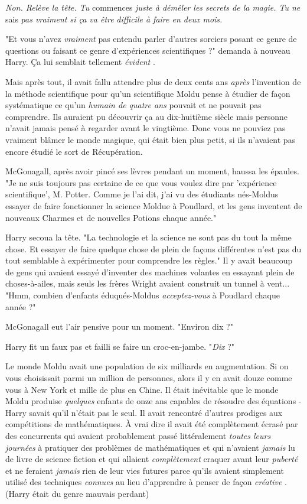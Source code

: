 \emph{Non. Relève la tête. Tu } commences \emph{juste à démêler les secrets de la magie. Tu ne } sais\emph{ pas vraiment si ça va être } \emph{difficile à faire en deux mois.} 

"Et vous n'avez \emph{vraiment}  pas entendu parler d'autres sorciers posant ce genre de questions ou faisant ce genre d'expériences scientifiques ?" demanda à nouveau Harry. Ça lui semblait tellement \emph{évident} .

Mais après tout, il avait fallu attendre plus de deux cents ans \emph{après}  l'invention de la méthode scientifique pour qu'un scientifique Moldu pense à étudier de façon systématique ce qu'un \emph{humain de quatre ans}  pouvait et ne pouvait pas comprendre. Ils auraient pu découvrir ça au dix-huitième siècle mais personne n'avait jamais pensé à regarder avant le vingtième. Donc vous ne pouviez pas vraiment blâmer le monde magique, qui était bien plus petit, si ils n'avaient pas encore étudié le sort de Récupération.

McGonagall, après avoir pincé ses lèvres pendant un moment, haussa les épaules. "Je ne suis toujours pas certaine de ce que vous voulez dire par 'expérience scientifique', M. Potter. Comme je l'ai dit, j'ai vu des étudiants nés-Moldus essayer de faire fonctionner la science Moldue à Poudlard, et les gens inventent de nouveaux Charmes et de nouvelles Potions chaque année."

Harry secoua la tête. "La technologie et la science ne sont pas du tout la même chose. Et essayer de faire quelque chose de plein de façons différentes n'est pas du tout semblable à expérimenter pour comprendre les règles." Il y avait beaucoup de gens qui avaient essayé d'inventer des machines volantes en essayant plein de choses-à-ailes, mais seuls les frères Wright avaient construit un tunnel à vent... "Hmm, combien d'enfants éduqués-Moldus \emph{acceptez-vous}  à Poudlard chaque année ?"

McGonagall eut l'air pensive pour un moment. "Environ dix ?"

Harry fit un faux pas et failli se faire un croc-en-jambe. "\emph{Dix}  ?"

Le monde Moldu avait une population de six milliards en augmentation. Si on vous choisissait parmi un million de personnes, alors il y en avait douze comme vous à New York et mille de plus en Chine. Il était inévitable que le monde Moldu produise \emph{quelques}  enfants de onze ans capables de résoudre des équations - Harry savait qu'il n'était pas le seul. Il avait rencontré d'autres prodiges aux compétitions de mathématiques. À vrai dire il avait été complètement écrasé par des concurrents qui avaient probablement passé littéralement \emph{toutes leurs journées}  à pratiquer des problèmes de mathématiques et qui n'avaient \emph{jamais}  lu de livre de science fiction et qui allaient \emph{complètement}  craquer avant leur \emph{puberté}  et ne feraient \emph{jamais}  rien de leur vies futures parce qu'ils avaient simplement utilisé des techniques \emph{connues}  au lieu d'apprendre à penser de façon \emph{créative} . (Harry était du genre mauvais perdant)

